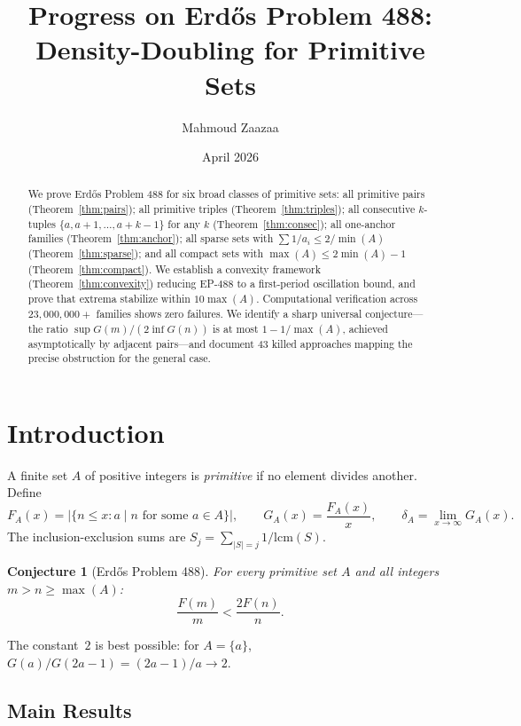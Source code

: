 \documentclass[11pt,a4paper]{article}
\title{Progress on Erd\H{o}s Problem 488:\\
Density-Doubling for Primitive Sets}
\author{Mahmoud Zaazaa}
\date{April 2026}
\newtheorem{conjecture}[theorem]{Conjecture}
\theoremstyle{definition}
\begin{document}
\maketitle

\begin{abstract}
We prove Erd\H{o}s Problem 488 for six broad classes of primitive
sets: all primitive pairs (Theorem~\ref{thm:pairs}); all primitive
triples (Theorem~\ref{thm:triples}); all consecutive $k$-tuples
$\{a,a{+}1,\ldots,a{+}k{-}1\}$ for any $k$ (Theorem~\ref{thm:consec});
all one-anchor families (Theorem~\ref{thm:anchor}); all sparse sets
with $\sum 1/a_i \leq 2/\min(A)$ (Theorem~\ref{thm:sparse}); and all
compact sets with $\max(A) \leq 2\min(A){-}1$
(Theorem~\ref{thm:compact}). We establish a convexity framework
(Theorem~\ref{thm:convexity}) reducing EP-488 to a first-period
oscillation bound, and prove that extrema stabilize within $10\max(A)$.
Computational verification across $23{,}000{,}000+$ families shows
zero failures. We identify a sharp universal conjecture---the ratio
$\sup G(m)/(2\inf G(n))$ is at most $1 - 1/\max(A)$, achieved
asymptotically by adjacent pairs---and document 43 killed approaches
mapping the precise obstruction for the general case.
\end{abstract}

\tableofcontents
\newpage

\section{Introduction}

A finite set $A$ of positive integers is \emph{primitive} if no element
divides another. Define
\[
F_A(x) = |\{n \leq x : a \mid n \text{ for some } a \in A\}|,
\qquad G_A(x) = \frac{F_A(x)}{x},
\qquad \delta_A = \lim_{x\to\infty} G_A(x).
\]
The inclusion-exclusion sums are $S_j = \sum_{|S|=j} 1/\mathrm{lcm}(S)$.

\begin{conjecture}[Erd\H{o}s Problem 488]\label{conj:main}
For every primitive set $A$ and all integers $m > n \geq \max(A)$:
\[
\frac{F(m)}{m} < \frac{2F(n)}{n}.
\]
\end{conjecture}

The constant~$2$ is best possible: for $A = \{a\}$,
$G(a)/G(2a{-}1) = (2a{-}1)/a \to 2$.

\subsection{Main Results}
\end{document}
